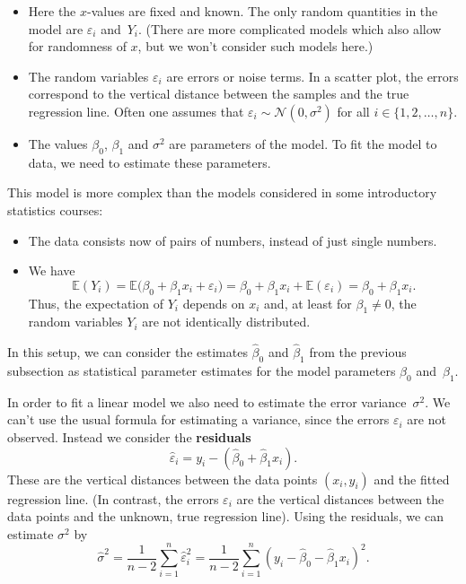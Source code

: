 \documentclass[
  a4paper,
]{article}
\providecommand{\tightlist}{%
  \setlength{\itemsep}{0pt}\setlength{\parskip}{0pt}}
\theoremstyle{definition}
\theoremstyle{definition}
\theoremstyle{definition}
\theoremstyle{definition}
\theoremstyle{remark}
\begin{document}
\begin{itemize}
\tightlist
\item
  Here the \(x\)-values are fixed and known. The only
  random quantities in the model are \(\varepsilon_i\) and~\(Y_i\). (There are
  more complicated models which also allow for randomness of \(x\), but
  we won't consider such models here.)
\item
  The random variables \(\varepsilon_i\) are errors or
  noise terms. In a scatter plot, the errors correspond to the
  vertical distance between the samples and the true regression line.
  Often one assumes that \(\varepsilon_i \sim \mathcal{N}(0, \sigma^2)\) for all
  \(i \in \{1, 2, \ldots, n\}\).
\item
  The values \(\beta_0\), \(\beta_1\) and \(\sigma^2\) are parameters of
  the model. To fit the model to data, we need to estimate these
  parameters.
\end{itemize}

This model is more complex than the models considered in some
introductory statistics courses:

\begin{itemize}
\tightlist
\item
  The data consists now of pairs of numbers, instead of just
  single numbers.
\item
  We have
  \begin{equation*}
    \mathbb{E}(Y_i)
    = \mathbb{E}\bigl( \beta_0 + \beta_1 x_i + \varepsilon_i \bigr)
    = \beta_0 + \beta_1 x_i + \mathbb{E}(\varepsilon_i)
    = \beta_0 + \beta_1 x_i.
  \end{equation*}
  Thus, the expectation of \(Y_i\) depends on \(x_i\) and, at least for
  \(\beta_1 \neq 0\), the random variables \(Y_i\) are not identically
  distributed.
\end{itemize}

In this setup, we can consider the estimates \(\hat\beta_0\) and \(\hat\beta_1\)
from the previous subsection as statistical parameter estimates for the
model parameters \(\beta_0\) and~\(\beta_1\).

In order to fit a linear model we also need to estimate the error
variance~\(\sigma^2\). We can't use the usual formula for estimating
a variance, since the errors \(\varepsilon_i\) are not observed. Instead we
consider the \textbf{residuals}
\begin{equation*}
  \hat\varepsilon_i
  = y_i - (\hat\beta_0 + \hat\beta_1 x_i).
\end{equation*}
These are the vertical distances between the data points \((x_i, y_i)\) and the
fitted regression line. (In contrast, the errors \(\varepsilon_i\) are the vertical
distances between the data points and the unknown, true regression line).
Using the residuals, we can estimate \(\sigma^2\) by
\begin{equation}
  \hat\sigma^2
  = \frac{1}{n-2} \sum_{i=1}^n \hat\varepsilon_i^2
  = \frac{1}{n-2} \sum_{i=1}^n (y_i - \hat\beta_0 - \hat\beta_1 x_i)^2.
  \label{eq:reg-sigma-est}
\end{equation}
\end{document}
